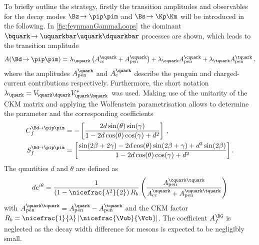 To briefly outline the strategy, firstly the transition amplitudes and \CP observables for the decay modes $\Bz\!\to\pip\pim$ and $\Bs\!\to\Kp\Km$ will be introduced in the following.
In \cref{fig:feynmanGammaLoops} the dominant $\bquark\!\to\uquarkbar\uquark\dquarkbar$ processes are shown, which leads to the transition amplitude
\begin{equation}
A\!\left(\Bd\!\to\pip\pim\right)=\lambda_\uquark\left(A_{\text{cc}}^\uquark+A_{\text{pen}}^\uquark\right)+\lambda_\cquark A_{\text{pen}}^\cquark+\lambda_\tquark A_{\text{pen}}^\tquark\,,
\end{equation}
where the amplitudes $A_{\text{pen}}^\quark$ and $A_{\text{c}}^\quark$ describe the penguin and charged-current contributions respectively.
Furthermore, the short notation $\lambda_\quark=V_{{\kern -0.1em}\quark\dquark}V^{*}_{{\kern -0.1em}\quark\bquark}$ was used.
Making use of the unitarity of the CKM matrix and applying the Wolfenstein parametrisation \cite{Wolfenstein:1983yz} allows to determine the parameter \Lf and the corresponding \CP coefficients
\begin{equation}
\begin{aligned}
C_{f}^{\Bd\!\to\pip\pim}&=-\left[\frac{2d\sin\!\left(\theta\right)\sin\!\left(\gamma\right)}{1-2d\cos\!\left(\theta\right)\cos\!\left(\gamma\right)+d^2}\right]\,,\\
S_{f}^{\Bd\!\to\pip\pim}&=\left[\frac{\sin\!\left(2\beta+2\gamma\right)-2d\cos\!\left(\theta\right)\sin\!\left(2\beta+\gamma\right)+d^2\sin\!\left(2\beta\right)}{1-2d\cos\!\left(\theta\right)\cos\!\left(\gamma\right)+d^2}\right].
\end{aligned}
\end{equation}
The quantities $d$ and $\theta$ are defined as
\begin{equation}
de^{i\theta}=\frac{1}{\left(1-\nicefrac{\lambda^2}{2}\right)R_b}\left(\frac{A_{\text{pen}}^{\cquark\tquark}}{A_{\text{cc}}^{\uquark}+A_{\text{pen}}^{\uquark\tquark}}\right)
\end{equation}
with $A_{\text{pen}}^{\quark\tquark}=A_{\text{pen}}^{\quark}-A_{\text{pen}}^{\tquark}$ and the CKM factor $R_b=\nicefrac{1}{\lambda}\left|\nicefrac{\Vub}{\Vcb}\right|$.
The \CP coefficient $A_f^{\DG}$ is neglected as the decay width difference for \Bd mesons is expected to be negligibly small.


